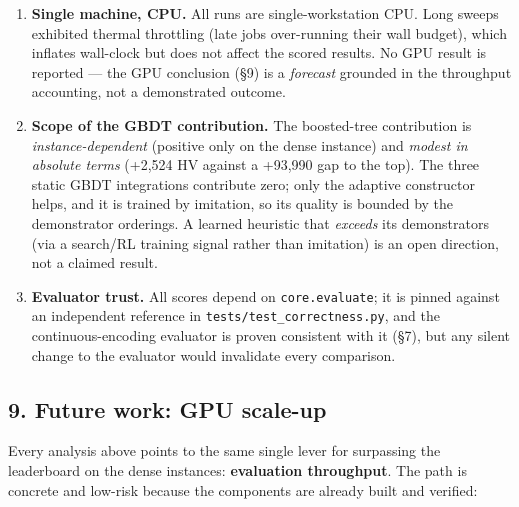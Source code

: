 \documentclass[
  11pt,
]{article}
\begin{document}
\begin{enumerate}
  \textbf{Leaderboard reference.} The ``\% of top'' figures are against
  the best scores \emph{observed} on the public leaderboard at the time
  of writing; leaderboards drift, so these should be re-verified against
  the live board before any external claim.
\item
  \textbf{Single machine, CPU.} All runs are single-workstation CPU.
  Long sweeps exhibited thermal throttling (late jobs over-running their
  wall budget), which inflates wall-clock but does not affect the scored
  results. No GPU result is reported --- the GPU conclusion (§9) is a
  \emph{forecast} grounded in the throughput accounting, not a
  demonstrated outcome.
\item
  \textbf{Scope of the GBDT contribution.} The boosted-tree contribution
  is \emph{instance-dependent} (positive only on the dense instance) and
  \emph{modest in absolute terms} (+2,524 HV against a +93,990 gap to
  the top). The three static GBDT integrations contribute zero; only the
  adaptive constructor helps, and it is trained by imitation, so its
  quality is bounded by the demonstrator orderings. A learned heuristic
  that \emph{exceeds} its demonstrators (via a search/RL training signal
  rather than imitation) is an open direction, not a claimed result.
\item
  \textbf{Evaluator trust.} All scores depend on \texttt{core.evaluate};
  it is pinned against an independent reference in
  \texttt{tests/test\_correctness.py}, and the continuous-encoding
  evaluator is proven consistent with it (§7), but any silent change to
  the evaluator would invalidate every comparison.
\end{enumerate}

\hypertarget{future-work-gpu-scale-up}{%
\subsection{9. Future work: GPU
scale-up}\label{future-work-gpu-scale-up}}

Every analysis above points to the same single lever for surpassing the
leaderboard on the dense instances: \textbf{evaluation throughput}. The
path is concrete and low-risk because the components are already built
and verified:
\end{document}
